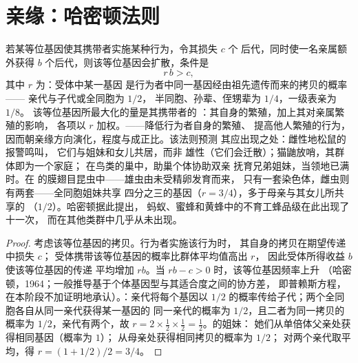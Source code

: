 \section{亲缘：哈密顿法则}

\begin{theorem}[哈密顿法则]\label{thm:b3:behavioural-ecology:hamilton}
若某等位基因使其携带者实施某种行为，令其损失 $c$ 个
后代，同时使一名亲属额外获得 $b$ 个后代，则该等位基因会扩散，条件是
\[
r\,b > c ,
\]
其中 $r$ 为\emph{}：受体中某一基因
是行为者中同一基因经由祖先遗传而来的拷贝的概率——
亲代与子代或全同胞为 $1/2$，
半同胞、孙辈、侄甥辈为 $1/4$，一级表亲为 $1/8$。
该等位基因所最大化的量是其携带者的
\emph{}：其自身的繁殖，加上其对亲属繁殖的影响，
各项以 $r$ 加权。\emph{}——降低行为者自身的繁殖、
提高他人繁殖的行为，
因而朝亲缘方向演化，程度与成正比。该法则预测
其应出现之处：雌性地松鼠的报警鸣叫，
它们与姐妹和女儿共居，而非
雄性（它们会迁散）；猫鼬放哨，其群体即为一个家庭；
在鸟类的巢中，助巢个体协助双亲
抚育兄弟姐妹，当领地已满时。在
\emph{}的膜翅目昆虫中——雄虫由未受精卵发育而来，
只有一套染色体，雌虫则有两套——全同胞姐妹共享
四分之三的基因（$r = 3/4$），多于母亲与其女儿所共享的
（$1/2$）。哈密顿据此提出，
蚂蚁、蜜蜂和黄蜂中的不育工蜂品级在此出现了十一次，
而在其他类群中几乎从未出现。
\end{theorem}
\begin{proof}
考虑该等位基因的拷贝。行为者实施该行为时，
其自身的拷贝在期望传递中损失 $c$；
受体携带该等位基因的概率比群体平均值高出 $r$，
因此受体所得收益 $b$ 使该等位基因的传递
平均增加 $rb$。当 $rb - c > 0$ 时，该等位基因频率上升
（哈密顿，1964；一般推导基于个体基因型与其适合度之间的协方差，
即普赖斯方程，
在本阶段不加证明地承认）。：亲代将每个基因以
$1/2$ 的概率传给子代；两个全同胞各自从同一亲代获得某一基因的
同一亲代的概率为 $1/2$，且二者为同一拷贝的概率为
$1/2$，亲代有两个，故 $r = 2\times\tfrac{1}{2}
\times\tfrac{1}{2} = \tfrac{1}{2}$。的姐妹：
她们从单倍体父亲处获得相同基因（概率为 $1$）；
从母亲处获得相同拷贝的概率为 $1/2$；
对两个亲代取平均，得 $r = (1 + 1/2)/2 = 3/4$。
\end{proof}

